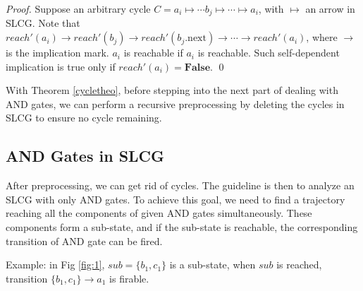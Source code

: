 \documentclass[runningheads]{llncs}
\newcommand{\ac}[3]{$\{#1\}\rightarrow#3$}
\begin{document}
\begin{proof}
Suppose an arbitrary cycle $C=a_i\mapsto \cdots b_j\mapsto\cdots \mapsto a_i$, with $\mapsto$ an arrow in SLCG. Note that $reach'(a_i)\to reach'(b_j)\to reach'(b_j.\text{next})\to\cdots\to reach'(a_i)$, where $\to$ is the implication mark. $a_i$ is reachable if $a_i$ is reachable. Such self-dependent implication is true only if $reach'(a_i)=\mathbf{False}$.
\qed
\end{proof}



With Theorem \ref{cycletheo}, before stepping into the next part of dealing with AND gates, we can perform a recursive preprocessing by deleting the cycles in SLCG to ensure no cycle remaining.

\subsection{AND Gates in SLCG}\label{sectAndGates}
After preprocessing, we can get rid of cycles.
The guideline is then to analyze an SLCG with only AND gates.
To achieve this goal, we need to find a trajectory reaching all the components of given AND gates simultaneously.
These components form a sub-state, and if the sub-state is reachable, the corresponding transition of AND gate can be fired. 

Example: in Fig \ref{fig:1}, $sub=\{ b_1,c_1\}$ is a sub-state, when $sub$ is reached, transition \ac{b_1,c_1}{a_0}{a_1} is firable.
\end{document}
